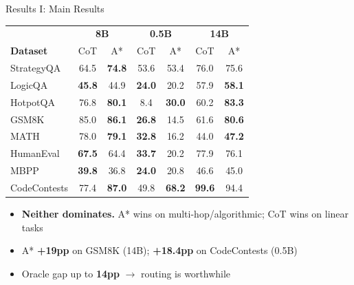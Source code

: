 \documentclass[t]{beamer}
\begin{document}
\begin{frame}{Results I: Main Results}

\begin{table}
\centering
\scriptsize
\setlength{\tabcolsep}{2.5pt}
\begin{tabular}{l|cc|cc|cc}
\toprule
& \multicolumn{2}{c|}{\textbf{8B}} & \multicolumn{2}{c|}{\textbf{0.5B}} & \multicolumn{2}{c}{\textbf{14B}} \\
\textbf{Dataset} & CoT & A* & CoT & A* & CoT & A* \\
\midrule
StrategyQA & 64.5 & \textbf{74.8} & 53.6 & 53.4 & 76.0 & 75.6 \\
LogicQA & \textbf{45.8} & 44.9 & \textbf{24.0} & 20.2 & 57.9 & \textbf{58.1} \\
HotpotQA & 76.8 & \textbf{80.1} & 8.4 & \textbf{30.0} & 60.2 & \textbf{83.3} \\
\midrule
GSM8K & 85.0 & \textbf{86.1} & \textbf{26.8} & 14.5 & 61.6 & \textbf{80.6} \\
MATH & 78.0 & \textbf{79.1} & \textbf{32.8} & 16.2 & 44.0 & \textbf{47.2} \\
\midrule
HumanEval & \textbf{67.5} & 64.4 & \textbf{33.7} & 20.2 & 77.9 & 76.1 \\
MBPP & \textbf{39.8} & 36.8 & \textbf{24.0} & 20.8 & 46.6 & 45.0 \\
CodeContests & 77.4 & \textbf{87.0} & 49.8 & \textbf{68.2} & \textbf{99.6} & 94.4 \\
\bottomrule
\end{tabular}
\end{table}

\vspace{-0.2em}
\begin{itemize}\small
    \item \textbf{Neither dominates.} A* wins on multi-hop/algorithmic; CoT wins on linear tasks
    \item A* \textbf{+19pp} on GSM8K (14B); \textbf{+18.4pp} on CodeContests (0.5B)
    \item Oracle gap up to \textbf{14pp} $\rightarrow$ routing is worthwhile
\end{itemize}

\end{frame}
\end{document}
